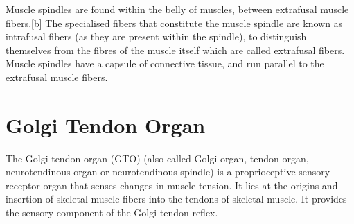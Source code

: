 Muscle spindles are found within the belly of muscles, between extrafusal muscle fibers.{[}b{]} The specialised fibers that constitute the muscle spindle are known as intrafusal fibers (as they are present within the spindle), to distinguish themselves from the fibres of the muscle itself which are called extrafusal fibers. Muscle spindles have a capsule of connective tissue, and run parallel to the extrafusal muscle fibers.

\hypertarget{golgi-tendon-organ}{%
\section{Golgi Tendon Organ}\label{golgi-tendon-organ}}

The Golgi tendon organ (GTO) (also called Golgi organ, tendon organ, neurotendinous organ or neurotendinous spindle) is a proprioceptive sensory receptor organ that senses changes in muscle tension. It lies at the origins and insertion of skeletal muscle fibers into the tendons of skeletal muscle. It provides the sensory component of the Golgi tendon reflex.




